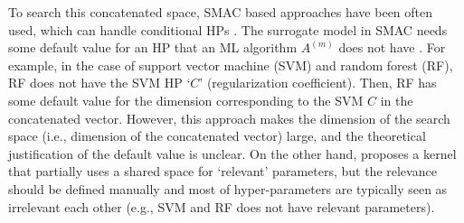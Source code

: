 To search this concatenated space, SMAC \cite{hutter2011sequential} based approaches have been often used, which can handle conditional HPs \cite{thornton2013auto,levesque2017bayesian}.
%
The surrogate model in SMAC needs some default value for an HP that an ML algorithm $A^{(m)}$ does not have \cite{levesque2017bayesian}.
%
For example, in the case of support vector machine (SVM) and random forest (RF), RF does not have the SVM HP `$C$' (regularization coefficient). 
%
Then, RF has some default value for the dimension corresponding to the SVM $C$ in the concatenated vector.
%
However, this approach makes the dimension of the search space (i.e., dimension of the concatenated vector) large, and the theoretical justification of the default value is unclear.
%
On the other hand, \cite{swersky2013raiders} proposes a kernel that partially uses a shared space for `relevant' parameters, but the relevance should be defined manually and most of hyper-parameters are typically seen as irrelevant each other (e.g., SVM and RF does not have relevant parameters). 




